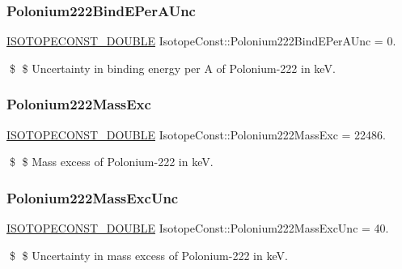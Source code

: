 \subsubsection{\texorpdfstring{Polonium222\+Bind\+E\+Per\+A\+Unc}{Polonium222BindEPerAUnc}}
{\footnotesize\ttfamily \mbox{\hyperlink{group___isotope_const-_macros_ga8f45a7272ce02c0b4c65c44636ed719a}{I\+S\+O\+T\+O\+P\+E\+C\+O\+N\+S\+T\+\_\+\+D\+O\+U\+B\+LE}} Isotope\+Const\+::\+Polonium222\+Bind\+E\+Per\+A\+Unc = 0.}

\$ \$ Uncertainty in binding energy per A of Polonium-\/222 in keV. \mbox{\label{group___isotope_const-_polonium-_po222_ga3364ea317892fee96a1e4bc03c319d24}} 
\subsubsection{\texorpdfstring{Polonium222\+Mass\+Exc}{Polonium222MassExc}}
{\footnotesize\ttfamily \mbox{\hyperlink{group___isotope_const-_macros_ga8f45a7272ce02c0b4c65c44636ed719a}{I\+S\+O\+T\+O\+P\+E\+C\+O\+N\+S\+T\+\_\+\+D\+O\+U\+B\+LE}} Isotope\+Const\+::\+Polonium222\+Mass\+Exc = 22486.}

\$ \$ Mass excess of Polonium-\/222 in keV. \mbox{\label{group___isotope_const-_polonium-_po222_ga6dc7a7dfa28e2176400694c52931fb87}} 
\subsubsection{\texorpdfstring{Polonium222\+Mass\+Exc\+Unc}{Polonium222MassExcUnc}}
{\footnotesize\ttfamily \mbox{\hyperlink{group___isotope_const-_macros_ga8f45a7272ce02c0b4c65c44636ed719a}{I\+S\+O\+T\+O\+P\+E\+C\+O\+N\+S\+T\+\_\+\+D\+O\+U\+B\+LE}} Isotope\+Const\+::\+Polonium222\+Mass\+Exc\+Unc = 40.}

\$ \$ Uncertainty in mass excess of Polonium-\/222 in keV. \mbox{\label{group___isotope_const-_polonium-_po222_ga76d703c88bf50ac8e45753a16b741c48}} 
